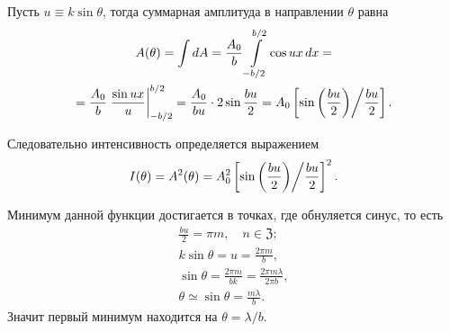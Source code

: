 Пусть $u \equiv k \sin \theta$, тогда суммарная амплитуда в направлении $\theta$ равна
\begin{multline*}
	A(\theta)
	= \int dA
	= \frac{A_0}{b} \int\limits_{-b/2}^{b/2} \cos ux\,dx =\\
	= \frac{A_0}{b} \left. \frac{\sin ux}{u} \right|_{-b/2}^{b/2}
	= \frac{A_0}{bu} \cdot 2 \sin \frac{bu}{2} = A_0 \left[ \sin \left( \frac{bu}{2}\right) \middle/  \frac{bu}{2} \right] .
\end{multline*}

Следовательно интенсивность определяется выражением
\begin{equation}
	I(\theta) = A^2(\theta) = A_0^2 \left[ \sin \left( \frac{bu}{2}\right) \middle/  \frac{bu}{2} \right]^2.
\end{equation}

Минимум данной функции достигается в точках, где обнуляется синус, то есть
\begin{gather*}
	\frac{bu}{2} = \pi m, \quad n \in \mathfrak Z;\\
	k \sin \theta = u = \frac{2 \pi m}{b},\\
	\sin \theta = \frac{2 \pi m}{bk} = \frac{2 \pi m \lambda}{2 \pi b},\\
	\theta \simeq \sin \theta = \frac{m \lambda}{b}.
\end{gather*}
Значит первый минимум находится на $\theta = \lambda/b$.



